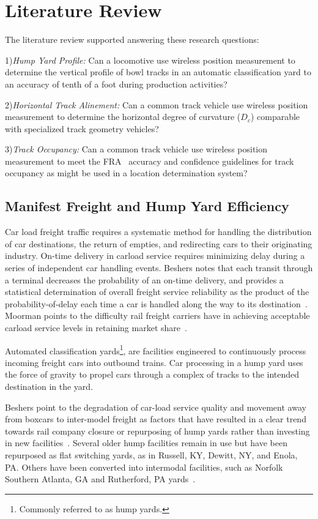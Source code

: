 \chapter{Literature Review}
The literature review supported answering these research questions:

1)\emph{Hump Yard Profile:}
Can a locomotive use wireless position measurement to determine the vertical profile of bowl tracks in an automatic classification yard to an accuracy of tenth of a foot during production activities?

2)\emph{Horizontal Track Alinement:}
Can a common track vehicle use wireless position measurement to determine the horizontal degree of curvature ($D_c$) comparable with specialized track geometry vehicles?

3)\emph{Track Occupancy:}
Can a common track vehicle use wireless position measurement to meet the FRA~\citep[pp.6-7]{1995FRADiffe} accuracy and confidence guidelines for track occupancy as might be used in a location determination system?

\section{Manifest Freight and Hump Yard Efficiency}
Car load freight traffic requires a systematic method for handling the distribution of car destinations, the return of empties, and redirecting cars to their originating industry. On-time delivery in carload service requires minimizing delay during a series of independent car handling events. Beshers notes that each transit through a terminal decreases the probability of an on-time delivery, and provides a statistical determination of overall freight service reliability as the product of the probability-of-delay each time a car is handled along the way to its destination~\citep{2004beshers}. Moorman points to the difficulty rail freight carriers have in achieving acceptable carload service levels in retaining market share~\citep{2006moorman}.

Automated classification yards\footnote{Commonly referred to as hump yards.}, are facilities engineered to continuously process incoming freight cars into outbound trains. Car processing in a hump yard uses the force of gravity to propel cars through a complex of tracks to the intended destination in the yard.

Beshers point to the degradation of car-load service quality and movement away from boxcars to inter-model freight as factors that have resulted in a clear trend towards rail company closure or repurposing of hump yards rather than investing in new facilities~\citep{2004beshers}. Several older hump facilities remain in use but have been repurposed as flat switching yards, as in Russell, KY, Dewitt, NY, and Enola, PA. Others have been converted into intermodal facilities, such as Norfolk Southern Atlanta, GA and Rutherford, PA yards~\citep{2002HumpTrains}.

